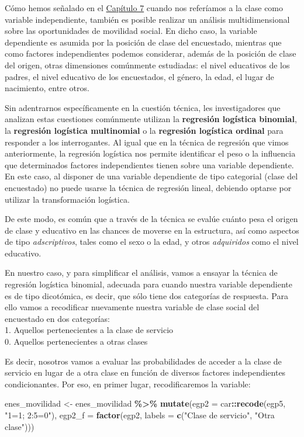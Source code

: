 \documentclass[
]{article}
\newenvironment{Shaded}{\begin{snugshade}}{\end{snugshade}}
\newcommand{\AttributeTok}[1]{\textcolor[rgb]{0.13,0.29,0.53}{#1}}
\newcommand{\FunctionTok}[1]{\textcolor[rgb]{0.13,0.29,0.53}{\textbf{#1}}}
\newcommand{\NormalTok}[1]{#1}
\newcommand{\OtherTok}[1]{\textcolor[rgb]{0.56,0.35,0.01}{#1}}
\newcommand{\SpecialCharTok}[1]{\textcolor[rgb]{0.81,0.36,0.00}{\textbf{#1}}}
\newcommand{\StringTok}[1]{\textcolor[rgb]{0.31,0.60,0.02}{#1}}
\begin{document}
Cómo hemos señalado en el \protect\hyperlink{aprox}{Capítulo 7} cuando nos referíamos a la clase como variable independiente, también es posible realizar un análisis multidimensional sobre las oportunidades de movilidad social. En dicho caso, la variable dependiente es asumida por la posición de clase del encuestado, mientras que como factores independientes podemos considerar, además de la posición de clase del origen, otras dimensiones comúnmente estudiadas: el nivel educativos de los padres, el nivel educativo de los encuestados, el género, la edad, el lugar de nacimiento, entre otros.

Sin adentrarnos específicamente en la cuestión técnica, les investigadores que analizan estas cuestiones comúnmente utilizan la \textbf{regresión logística binomial}, la \textbf{regresión logística multinomial} o la \textbf{regresión logística ordinal} para responder a los interrogantes. Al igual que en la técnica de regresión que vimos anteriormente, la regresión logística nos permite identificar el peso o la influencia que determinados factores independientes tienen sobre una variable dependiente. En este caso, al disponer de una variable dependiente de tipo categorial (clase del encuestado) no puede usarse la técnica de regresión lineal, debiendo optarse por utilizar la transformación logística.

De este modo, es común que a través de la técnica se evalúe cuánto pesa el origen de clase y educativo en las chances de moverse en la estructura, así como aspectos de tipo \emph{adscriptivos}, tales como el sexo o la edad, y otros \emph{adquiridos} como el nivel educativo.

En nuestro caso, y para simplificar el análisis, vamos a ensayar la técnica de regresión logística binomial, adecuada para cuando nuestra variable dependiente es de tipo dicotómica, es decir, que sólo tiene dos categorías de respuesta. Para ello vamos a recodificar nuevamente nuestra variable de clase social del encuestado en dos categorías:\\
1. Aquellos pertenecientes a la clase de servicio\\
0. Aquellos pertenecientes a otras clases

Es decir, nosotros vamos a evaluar las probabilidades de acceder a la clase de servicio en lugar de a otra clase en función de diversos factores independientes condicionantes. Por eso, en primer lugar, recodificaremos la variable:

\begin{Shaded}
\begin{Highlighting}[]
\NormalTok{enes\_movilidad }\OtherTok{\textless{}{-}}\NormalTok{ enes\_movilidad }\SpecialCharTok{\%\textgreater{}\%}
    \FunctionTok{mutate}\NormalTok{(}\AttributeTok{egp2 =}\NormalTok{ car}\SpecialCharTok{::}\FunctionTok{recode}\NormalTok{(egp5, }\StringTok{"1=1; 2:5=0"}\NormalTok{), }\AttributeTok{egp2\_f =} \FunctionTok{factor}\NormalTok{(egp2, }\AttributeTok{labels =} \FunctionTok{c}\NormalTok{(}\StringTok{"Clase de servicio"}\NormalTok{,}
        \StringTok{"Otra clase"}\NormalTok{)))}
\end{Highlighting}
\end{Shaded}
\end{document}
